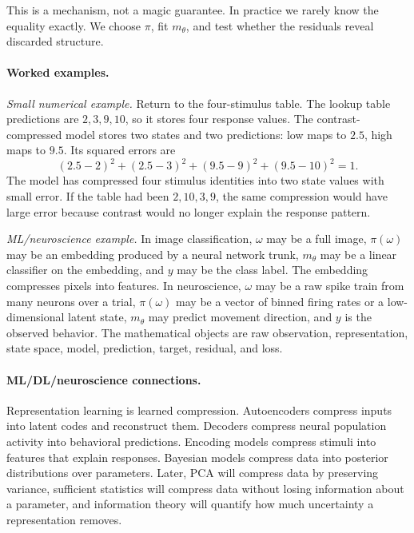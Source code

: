 This is a mechanism, not a magic guarantee. In practice we rarely know the equality exactly. We choose \(\pi\), fit \(m_\theta\), and test whether the residuals reveal discarded structure.

\paragraph{Worked examples.}
\emph{Small numerical example.} Return to the four-stimulus table. The lookup table predictions are \(2,3,9,10\), so it stores four response values. The contrast-compressed model stores two states and two predictions: low maps to \(2.5\), high maps to \(9.5\). Its squared errors are
\[
(2.5-2)^2+(2.5-3)^2+(9.5-9)^2+(9.5-10)^2=1.
\]
The model has compressed four stimulus identities into two state values with small error. If the table had been \(2,10,3,9\), the same compression would have large error because contrast would no longer explain the response pattern.

\emph{ML/neuroscience example.} In image classification, \(\omega\) may be a full image, \(\pi(\omega)\) may be an embedding produced by a neural network trunk, \(m_\theta\) may be a linear classifier on the embedding, and \(y\) may be the class label. The embedding compresses pixels into features. In neuroscience, \(\omega\) may be a raw spike train from many neurons over a trial, \(\pi(\omega)\) may be a vector of binned firing rates or a low-dimensional latent state, \(m_\theta\) may predict movement direction, and \(y\) is the observed behavior. The mathematical objects are raw observation, representation, state space, model, prediction, target, residual, and loss.

\paragraph{ML/DL/neuroscience connections.}
Representation learning is learned compression. Autoencoders compress inputs into latent codes and reconstruct them. Decoders compress neural population activity into behavioral predictions. Encoding models compress stimuli into features that explain responses. Bayesian models compress data into posterior distributions over parameters. Later, PCA will compress data by preserving variance, sufficient statistics will compress data without losing information about a parameter, and information theory will quantify how much uncertainty a representation removes.

